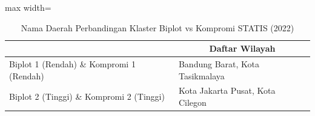 \begin{table}[H]
\centering
\caption{Nama Daerah Perbandingan Klaster Biplot vs Kompromi STATIS (2022)} \label{tab:sample2biplot_comp_name_2022}
\begin{adjustbox}{max width=\textwidth}
\begin{tabular}{|>{\centering\arraybackslash}p{4cm}|p{10cm}|}
\hline
\multicolumn{1}{|c|}{\textbf{Kategori}} & \multicolumn{1}{c|}{\textbf{Daftar Wilayah}} \\
\hline
Biplot 1 (Rendah) \& Kompromi 1 (Rendah) & Bandung Barat, Kota Tasikmalaya \\
\hline
Biplot 2 (Tinggi) \& Kompromi 2 (Tinggi) & Kota Jakarta Pusat, Kota Cilegon \\
\hline
\end{tabular}
\end{adjustbox}
\end{table}